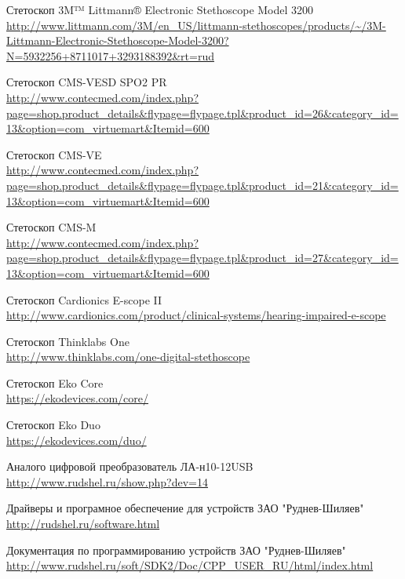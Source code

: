 \documentclass[../paper.tex]{subfiles}
\begin{document}
\renewcommand\refname{Список использованных источников}
% 
\begin{thebibliography}{}

Стетоскоп 3M™ Littmann® Electronic Stethoscope Model 3200\\
\url{http://www.littmann.com/3M/en_US/littmann-stethoscopes/products/~/3M-Littmann-Electronic-Stethoscope-Model-3200?N=5932256+8711017+3293188392&rt=rud}

Стетоскоп CMS-VESD SPO2 PR\\
\url{http://www.contecmed.com/index.php?page=shop.product_details&flypage=flypage.tpl&product_id=26&category_id=13&option=com_virtuemart&Itemid=600}

Стетоскоп CMS-VE\\
\url{http://www.contecmed.com/index.php?page=shop.product_details&flypage=flypage.tpl&product_id=21&category_id=13&option=com_virtuemart&Itemid=600}

Стетоскоп CMS-M\\
\url{http://www.contecmed.com/index.php?page=shop.product_details&flypage=flypage.tpl&product_id=27&category_id=13&option=com_virtuemart&Itemid=600}

Стетоскоп Cardionics E-scope II\\
\url{http://www.cardionics.com/product/clinical-systems/hearing-impaired-e-scope}

Стетоскоп Thinklabs One\\
\url{http://www.thinklabs.com/one-digital-stethoscope}

Стетоскоп Eko Core\\
\url{https://ekodevices.com/core/}

Стетоскоп Eko Duo\\
\url{https://ekodevices.com/duo/}

Аналого цифровой преобразователь ЛА-н10-12USB\\
\url{http://www.rudshel.ru/show.php?dev=14}

Драйверы и програмное обеспечение для устройств ЗАО "Руднев-Шиляев"\\
\url{http://rudshel.ru/software.html}

Документация по программированию устройств ЗАО "Руднев-Шиляев"\\
\url{http://www.rudshel.ru/soft/SDK2/Doc/CPP_USER_RU/html/index.html}


\end{thebibliography}
\end{document}
